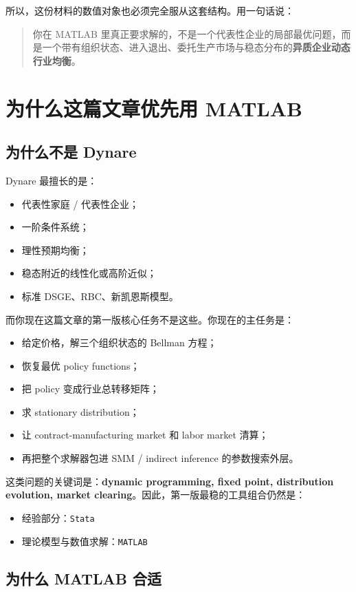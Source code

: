 \documentclass[12pt]{ctexart}
\begin{document}
所以，这份材料的数值对象也必须完全服从这套结构。用一句话说：
\begin{quote}
你在 MATLAB 里真正要求解的，不是一个代表性企业的局部最优问题，而是一个带有组织状态、进入退出、委托生产市场与稳态分布的\textbf{异质企业动态行业均衡}。
\end{quote}

\section{为什么这篇文章优先用 MATLAB}

\subsection{为什么不是 Dynare}

Dynare 最擅长的是：
\begin{itemize}
    \item 代表性家庭 / 代表性企业；
    \item 一阶条件系统；
    \item 理性预期均衡；
    \item 稳态附近的线性化或高阶近似；
    \item 标准 DSGE、RBC、新凯恩斯模型。
\end{itemize}

而你现在这篇文章的第一版核心任务不是这些。你现在的主任务是：
\begin{itemize}
    \item 给定价格，解三个组织状态的 Bellman 方程；
    \item 恢复最优 policy functions；
    \item 把 policy 变成行业总转移矩阵；
    \item 求 stationary distribution；
    \item 让 contract-manufacturing market 和 labor market 清算；
    \item 再把整个求解器包进 SMM / indirect inference 的参数搜索外层。
\end{itemize}

这类问题的关键词是：\textbf{dynamic programming, fixed point, distribution evolution, market clearing}。因此，第一版最稳的工具组合仍然是：
\begin{itemize}
    \item 经验部分：\texttt{Stata}
    \item 理论模型与数值求解：\texttt{MATLAB}
\end{itemize}

\subsection{为什么 MATLAB 合适}
\end{document}
